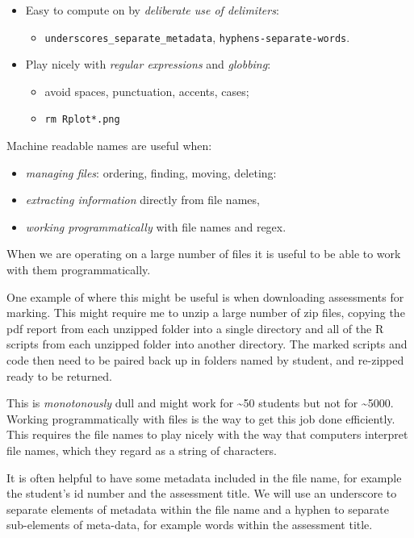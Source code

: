 \documentclass[
  12pt,
]{book}
\providecommand{\tightlist}{%
  \setlength{\itemsep}{0pt}\setlength{\parskip}{0pt}}
\begin{document}
\begin{itemize}
\tightlist
\item
  Easy to compute on by \emph{deliberate use of delimiters}:

  \begin{itemize}
  \tightlist
  \item
    \texttt{underscores\_separate\_metadata}, \texttt{hyphens-separate-words}.
  \end{itemize}
\item
  Play nicely with \emph{regular expressions} and \emph{globbing}:

  \begin{itemize}
  \tightlist
  \item
    avoid spaces, punctuation, accents, cases;
  \item
    \texttt{rm\ Rplot*.png}
  \end{itemize}
\end{itemize}

Machine readable names are useful when:

\begin{itemize}
\item
  \emph{managing files}: ordering, finding, moving, deleting:
\item
  \emph{extracting information} directly from file names,
\item
  \emph{working programmatically} with file names and regex.
\end{itemize}

When we are operating on a large number of files it is useful to be able to work with them programmatically.

One example of where this might be useful is when downloading assessments for marking. This might require me to unzip a large number of zip files, copying the pdf report from each unzipped folder into a single directory and all of the R scripts from each unzipped folder into another directory. The marked scripts and code then need to be paired back up in folders named by student, and re-zipped ready to be returned.

This is \emph{monotonously} dull and might work for \textasciitilde50 students but not for \textasciitilde5000. Working programmatically with files is the way to get this job done efficiently. This requires the file names to play nicely with the way that computers interpret file names, which they regard as a string of characters.

It is often helpful to have some metadata included in the file name, for example the student's id number and the assessment title. We will use an underscore to separate elements of metadata within the file name and a hyphen to separate sub-elements of meta-data, for example words within the assessment title.
\end{document}

